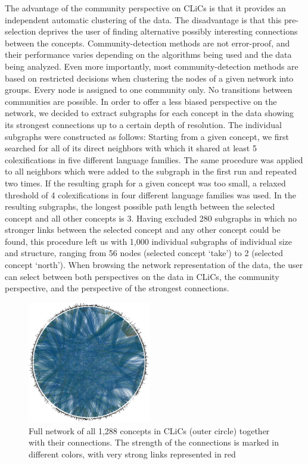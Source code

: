 The advantage of the community perspective on CLiCs is that it provides an independent automatic
clustering of the data. The disadvantage is that this pre-selection deprives the user of finding
alternative possibly interesting connections between the concepts. Community-detection methods are not
error-proof, and their performance varies depending on the algorithms being used and the data being analyzed.
Even more importantly, most community-detection methods are based on restricted decisions when
clustering the nodes of a given network into groups. Every node is assigned to one community only.
No transitions between communities are possible. In order to offer a less biased perspective on the
network, we decided to extract subgraphs for each concept in the data showing its strongest
connections up to a certain depth of resolution. The individual subgraphs were constructed as follows: Starting
from a given concept, we first searched for all of its direct neighbors with which it shared at
least 5 colexifications in five different language families. The same procedure was applied to all neighbors
which were added to the subgraph in the first run and repeated two times. If the resulting graph for a given concept was
too small, a relaxed threshold of 4 colexifications in four different language families was used.  
In the resulting subgraphs, the longest possible path length between the selected concept and all other
concepts is 3. Having excluded 280 subgraphs in which no stronger links between the selected concept and any
other concept could be found, this procedure left us with 1,000 individual subgraphs of individual
size and structure, ranging from 56 nodes (selected concept `take') to 2 (selected concept `north'). 
When browsing the network representation of the data, the user can select between both perspectives
on the data in CLiCs, the community perspective, and the perspective of the strongest connections.

\begin{figure}[b]
    \centering
   \includegraphics[width=0.48\textwidth]{img/completeNetworkLabels.jpg}
    \caption{Full network of all 1,288 concepts in CLiCs (outer circle) together with their connections. The strength of the connections is marked in different colors, with very strong links represented in red}
    \label{fig:clics_full}
\end{figure}


